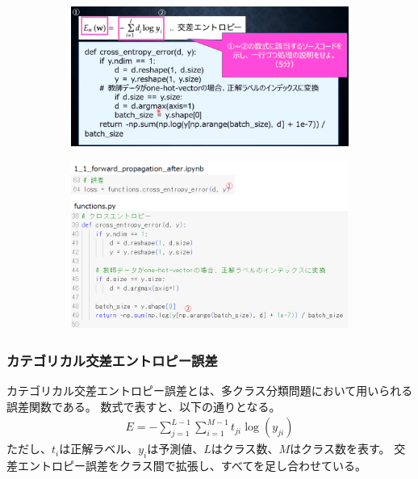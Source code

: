\documentclass{ltjsarticle}
\begin{document}
\begin{figure}[ht]
  \centering
  \begin{subfigure}[b]{0.45\textwidth}
    \centering
    \includegraphics[width=\textwidth]{./capture/confirm_test/day1_05_3.png}
    \caption{}
    \label{fig:day1_05_3}
  \end{subfigure}
  \hfill
  \begin{subfigure}[b]{0.45\textwidth}
    \centering
    \includegraphics[width=\textwidth]{./capture/confirm_test/day1_05_4.png}
    \caption{}
    \label{fig:day1_05_4}
  \end{subfigure}
  \caption{}
\end{figure}

\subsubsection{カテゴリカル交差エントロピー誤差}
カテゴリカル交差エントロピー誤差とは、多クラス分類問題において用いられる誤差関数である。
数式で表すと、以下の通りとなる。
\begin{align}
  E= -\sum_{j=1}^{L-1} \sum_{i=1}^{M-1} t_{ji} \log(y_{ji})
\end{align}
ただし、$t_i$は正解ラベル、$y_i$は予測値、$L$はクラス数、$M$はクラス数を表す。
交差エントロピー誤差をクラス間で拡張し、すべてを足し合わせている。
\end{document}
